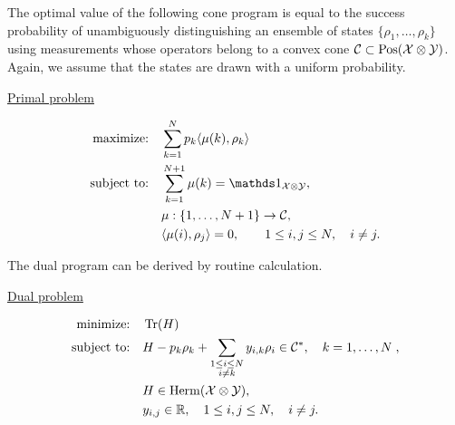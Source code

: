 The optimal value of the following cone program is equal to the success 
probability of unambiguously distinguishing an ensemble of states 
$\{ \rho_{1}, \ldots, \rho_{k} \}$ using measurements whose operators belong
to a convex cone $\mathcal{C} \subset \mathrm{Pos}(\mathcal{X}\otimes\mathcal{Y})$.
Again, we assume that the states are drawn with a uniform probability.
\begin{center}
    \centerline{\underline{Primal problem}}\vspace{-4mm}
    \begin{align}
      \text{maximize:}\quad & \sum_{k = 1}^N p_{k}\ip{\mu(k)}{\rho_{k}}\notag\\
      \text{subject to:}\quad & \sum_{k=1}^{N+1} \mu(k)= \I_{\X\otimes\Y}, \label{sdp-primal-unambiguous}\\
      & \mu : \{1, \ldots, N+1\} \rightarrow \C, \notag\\
      & \ip{\mu(i)}{\rho_{j}} = 0, \qquad 1 \leq i,j \leq N, \quad i \neq j. \notag
    \end{align}
\end{center}
The dual program can be derived by routine calculation.
\begin{center}
    \centerline{\underline{Dual problem}}\vspace{-4mm}
    \begin{align}
      \text{minimize:}\quad & \operatorname{Tr}(H)\notag\\
      \text{subject to:}\quad & H - p_{k}\rho_{k} + \sum_{\substack{1\leq i \leq N \\ i\neq k}}
          y_{i,k}\rho_{i} \in \mathcal{C}^{\ast}, \quad k=1,\ldots,N \; ,\label{sdp-dual-unambiguous}\\
      & H \in \mathrm{Herm}(\mathcal{X}\otimes\mathcal{Y}),\notag\\
      & y_{i,j} \in \mathbb{R}, \quad 1 \leq i,j \leq N, \quad i \neq j.\notag
    \end{align}
\end{center}
